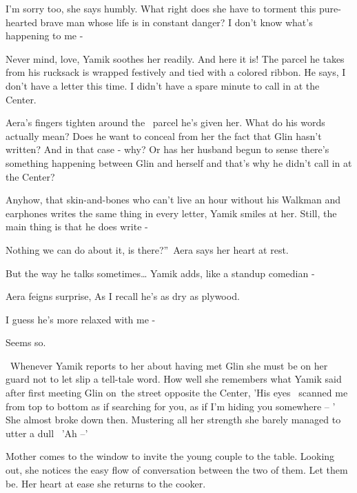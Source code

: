 \documentclass[letterpaper]{article}
\begin{document}
{\textquotedbl}I'm sorry too,{\textquotedbl} she says humbly. What right does she have to torment this pure-hearted
brave man whose life is in constant danger? {\textquotedbl}I don't know what's happening to me -{\textquotedbl} 

{\textquotedbl}Never mind, love,{\textquotedbl} Yamik soothes her readily. {\textquotedbl}And here it is!{\textquotedbl}
The parcel he takes from his rucksack is wrapped festively and tied with a colored ribbon. He says, {\textquotedbl}I
don't have a letter this time. I didn't have a spare minute to call in at the Center.{\textquotedbl} 

Aera's fingers tighten around the \ parcel he's given her. What do his words actually mean? Does he want to conceal from
her the fact that Glin hasn't written? And in that case - why? Or has her husband begun to sense there's something
happening between Glin and herself and that's why he didn't call in at the Center?

{\textquotedbl}Anyhow, that skin-and-bones who can't live an hour without his Walkman and earphones writes the same
thing in every letter, {\textquotedbl} Yamik smiles at her. {\textquotedbl}Still, the main thing is that he does write
-{\textquotedbl} 

{\textquotedbl}Nothing we can do about it, is there?''~Aera says her heart at rest.

{\textquotedbl}But the way he talks sometimes{\dots}{\textquotedbl} Yamik adds, {\textquotedbl}like a standup comedian
-{\textquotedbl} 

Aera feigns surprise, {\textquotedbl}As I recall he's as dry as plywood.{\textquotedbl}

{\textquotedbl}I guess he's more relaxed with me -{\textquotedbl} 

{\textquotedbl}Seems so.{\textquotedbl} 

\ Whenever Yamik reports to her about having met Glin she must be on her guard not to let slip a tell-tale word. How
well she remembers what Yamik said after first meeting Glin on~the street opposite the Center, 'His eyes \ scanned me
from top to bottom as if searching for you, as if I'm hiding you somewhere -- ' She almost broke down then. Mustering
all her strength she barely managed to utter a dull~ 'Ah --' 

Mother comes to the window to invite the young couple to the table. Looking out, she{ }notices the easy
flow of conversation between the two of them. Let them be. Her heart at ease she returns to the cooker.
\end{document}
